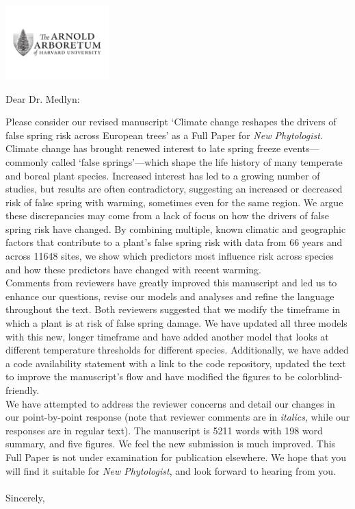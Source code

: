 \documentclass[11pt,a4paper]{letter}\usepackage[]{graphicx}\usepackage[]{color}
\begin{document}
\begin{letter}{}
\includegraphics[width=0.3\textwidth]{AA_logo.jpg}

\opening{Dear Dr. Medlyn:}

\noindent Please consider our revised manuscript `Climate change reshapes the drivers of false spring risk across European trees' as a Full Paper for \emph{New Phytologist.} 
\vspace{1.5ex}\\
Climate change has brought renewed interest to late spring freeze events---commonly called `false springs'---which shape the life history of many temperate and boreal plant species. Increased interest has led to a growing number of studies, but results are often contradictory, suggesting an increased or decreased risk of false spring with warming, sometimes even for the same region. We argue these discrepancies may come from a lack of focus on how the drivers of false spring risk have changed. By combining multiple, known climatic and geographic factors that contribute to a plant's false spring risk with data from 66 years and across 11648 sites, we show which predictors most influence risk across species and how these predictors have changed with recent warming.
\vspace{1.5ex}\\
Comments from reviewers have greatly improved this manuscript and led us to enhance our questions, revise our models and analyses and refine the language throughout the text. Both reviewers suggested that we modify the timeframe in which a plant is at risk of false spring damage. We have updated all three models with this new, longer timeframe and have added another model that looks at different temperature thresholds for different species.  Additionally, we have added a code availability statement with a link to the code repository, updated the text to improve the manuscript's flow and have modified the figures to be colorblind-friendly. 
\vspace{1.5ex}\\
We have attempted to address the reviewer concerns and detail our changes in our point-by-point response (note that reviewer comments are in \emph{italics}, while our responses are in regular text). The manuscript is 5211 words with 198 word summary, and five figures. We feel the new submission is much improved. This Full Paper is not under examination for publication elsewhere. We hope that you will find it suitable for \emph{New Phytologist}, and look forward to hearing from you.
\\\vspace{-1ex}\\
\noindent Sincerely,\\


\end{letter}
\end{document}
